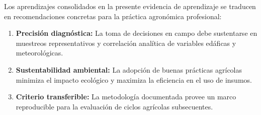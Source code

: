 \documentclass[
	spanish,
	letterpaper,
	oneside
]{article}
\def\defaultbibliography {bibliografia-uanl}
\begin{document}
Los aprendizajes consolidados en la presente evidencia de aprendizaje se traducen en recomendaciones concretas para la práctica agronómica profesional:
\begin{enumerate}
	\item \textbf{Precisión diagnóstica:} La toma de decisiones en campo debe sustentarse en muestreos representativos y correlación analítica de variables edáficas y meteorológicas.
	\item \textbf{Sustentabilidad ambiental:} La adopción de buenas prácticas agrícolas minimiza el impacto ecológico y maximiza la eficiencia en el uso de insumos.
	\item \textbf{Criterio transferible:} La metodología documentada provee un marco reproducible para la evaluación de ciclos agrícolas subsecuentes.
\end{enumerate}

\clearpage

\end{document}
